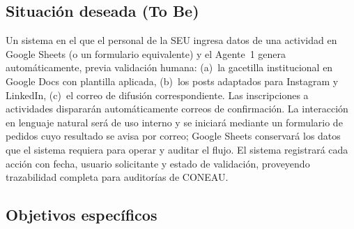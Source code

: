 \documentclass[a4paper, 12pt]{article}
\begin{document}
\subsection{Situaci\'on deseada (To Be)}

Un sistema en el que el personal de la \ac{SEU} ingresa datos de una actividad en Google Sheets (o un formulario equivalente) y el Agente~1 genera autom\'aticamente, previa validaci\'on humana: (a)~la gacetilla institucional en Google Docs con plantilla aplicada, (b)~los posts adaptados para Instagram y LinkedIn, (c)~el correo de difusi\'on correspondiente. Las inscripciones a actividades disparar\'an autom\'aticamente correos de confirmaci\'on. La interacci\'on en lenguaje natural ser\'a de uso interno y se iniciar\'a mediante un formulario de pedidos cuyo resultado se avisa por correo; Google Sheets conservar\'a los datos que el sistema requiera para operar y auditar el flujo. El sistema registrar\'a cada acci\'on con fecha, usuario solicitante y estado de validaci\'on, proveyendo trazabilidad completa para auditor\'ias de \ac{CONEAU}.

\subsection{Objetivos espec\'ificos}
\end{document}
